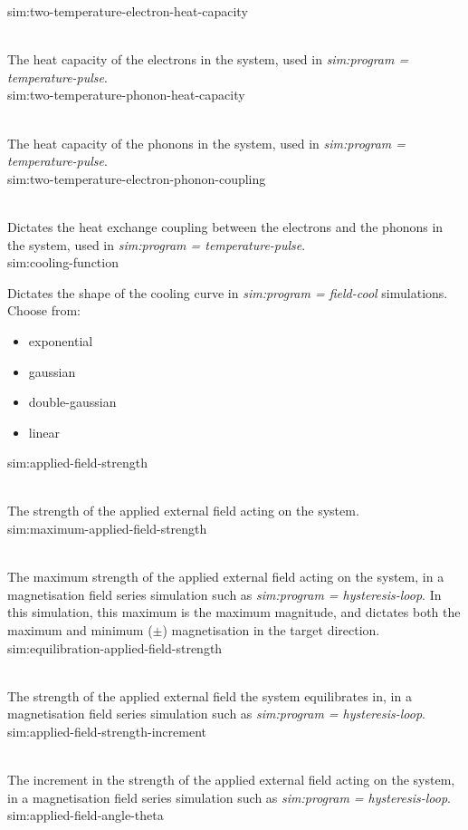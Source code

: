 {\zicf sim:two-temperature-electron-heat-capacity}\\
   The heat capacity of the electrons in the system, used in \textit{sim:program = temperature-pulse}.\\
{\zicf sim:two-temperature-phonon-heat-capacity}\\
   The heat capacity of the phonons in the system, used in \textit{sim:program = temperature-pulse}.\\
{\zicf sim:two-temperature-electron-phonon-coupling}\\
   Dictates the heat exchange coupling between the electrons and the phonons in the system, used in \textit{sim:program = temperature-pulse}.\\
{\zicf sim:cooling-function}
   Dictates the shape of the cooling curve in \textit{sim:program = field-cool} simulations. Choose from:
\begin{itemize}
    \item[] exponential
    \item[] gaussian
    \item[] double-gaussian
    \item[] linear\\
\end{itemize}
{\zicf sim:applied-field-strength}\\
   The strength of the applied external field acting on the system.\\

{\zicf  sim:maximum-applied-field-strength}\\
   The maximum strength of the applied external field acting on the system, in a magnetisation field series simulation such as \textit{sim:program = hysteresis-loop}. In this simulation, this maximum is the maximum magnitude, and dictates both the maximum and minimum ($\pm$) magnetisation in the target direction.\\
{\zicf sim:equilibration-applied-field-strength}\\
   The strength of the applied external field the system equilibrates in, in a magnetisation field series simulation such as \textit{sim:program = hysteresis-loop}.\\
{\zicf sim:applied-field-strength-increment}\\
   The increment in the strength of the applied external field acting on the system, in a magnetisation field series simulation such as \textit{sim:program = hysteresis-loop}.\\
{\zicf sim:applied-field-angle-theta}\\

